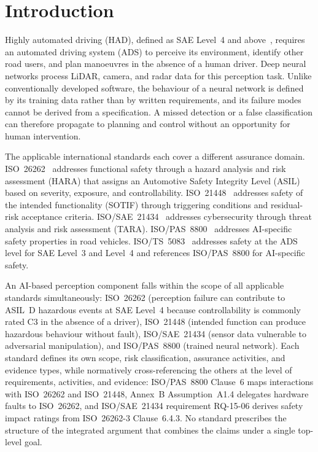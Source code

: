 \documentclass[runningheads]{llncs}
\newcommand{\new}[1]{#1}
\newcommand{\new}[1]{\textcolor{blue}{#1}}
\newcommand{\crev}[1]{\textcolor{blue!75!black}{#1}}
\newcommand{\crev}[1]{#1}
\begin{document}
	\section{Introduction}
	\label{sec:intro}
	
	Highly automated driving (HAD), defined as SAE Level~4 and above~\cite{SAEJ3016}, requires an automated driving system (ADS) to perceive its environment, identify other road users, and plan manoeuvres in the absence of a human driver. Deep neural networks process LiDAR, camera, and radar data for this perception task. Unlike conventionally developed software, the behaviour of a neural network is defined by its training data rather than by written requirements, and its failure modes cannot be derived from a specification. A missed detection or a false classification can therefore propagate to planning and control without an opportunity for human intervention.
	
	The applicable international standards each cover a different assurance domain. ISO~26262~\cite{ISO26262} addresses functional safety through a hazard analysis and risk assessment (HARA) that assigns an Automotive Safety Integrity Level (ASIL) based on severity, exposure, and controllability. ISO~21448~\cite{ISO21448} addresses safety of the intended functionality (SOTIF) through triggering conditions and residual-risk acceptance criteria. ISO/SAE~21434~\cite{ISO21434} addresses cybersecurity through threat analysis and risk assessment (TARA). ISO/PAS~8800~\cite{ISOPAS8800} addresses AI-specific safety properties in road vehicles. ISO/TS~5083~\cite{ISOTS5083} addresses safety at the ADS level for SAE Level~3 and Level~4 and references ISO/PAS~8800 for AI-specific safety.
	
	An AI-based perception component falls within the scope of all applicable standards simultaneously: ISO~26262 (perception failure can contribute to ASIL~D hazardous events at SAE Level~4 because controllability is \crev{commonly} rated C3 in the absence of a driver), ISO~21448 (intended function can produce hazardous behaviour without fault), ISO/SAE~21434 (sensor data vulnerable to adversarial manipulation), and ISO/PAS~8800 (trained neural network). \new{Each standard defines its own scope, risk classification, assurance activities, and evidence types, while normatively cross-referencing the others at the level of requirements, activities, and evidence: ISO/PAS~8800 Clause~6 maps interactions with ISO~26262 and ISO~21448, Annex~B Assumption~A1.4 delegates hardware faults to ISO~26262, and ISO/SAE~21434 requirement RQ-15-06 derives safety impact ratings from ISO~26262-3 Clause~6.4.3. No standard prescribes the structure of the integrated argument that combines the claims under a single top-level goal.}
	
\end{document}
